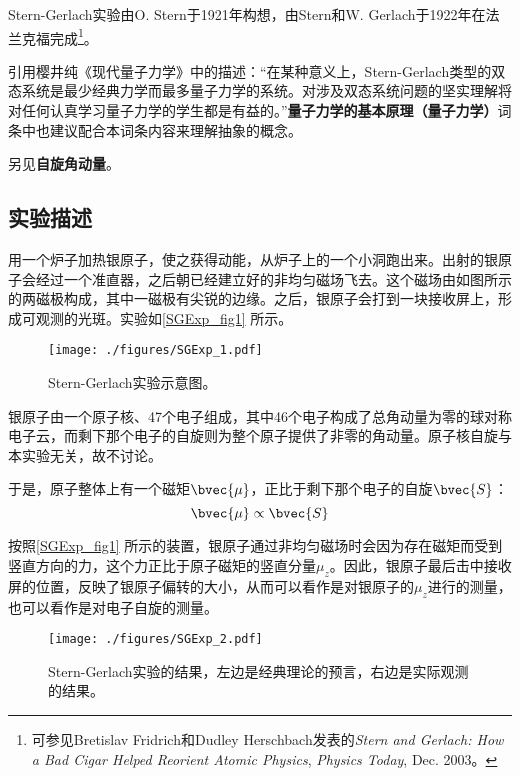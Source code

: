 


Stern-Gerlach实验由O. Stern于1921年构想，由Stern和W. Gerlach于1922年在法兰克福完成\footnote{可参见Bretislav Fridrich和Dudley Herschbach发表的\textsl{Stern and Gerlach: How a Bad Cigar Helped Reorient Atomic Physics}, \textsl{Physics Today}, Dec. 2003。}。

引用樱井纯《现代量子力学》中的描述：“在某种意义上，Stern-Gerlach类型的双态系统是最少经典力学而最多量子力学的系统。对涉及双态系统问题的坚实理解将对任何认真学习量子力学的学生都是有益的。”\textbf{量子力学的基本原理（量子力学）}词条中也建议配合本词条内容来理解抽象的概念。

另见\textbf{自旋角动量}。


\subsection{实验描述}

用一个炉子加热银原子，使之获得动能，从炉子上的一个小洞跑出来。出射的银原子会经过一个准直器，之后朝已经建立好的非均匀磁场飞去。这个磁场由如图所示的两磁极构成，其中一磁极有尖锐的边缘。之后，银原子会打到一块接收屏上，形成可观测的光斑。实验如\autoref{SGExp_fig1} 所示。


\begin{figure}[ht]
\centering
\texttt{[image: ./figures/SGExp\_1.pdf]}
\caption{Stern-Gerlach实验示意图。} \label{SGExp_fig1}
\end{figure}

银原子由一个原子核、47个电子组成，其中46个电子构成了总角动量为零的球对称电子云，而剩下那个电子的自旋则为整个原子提供了非零的角动量。原子核自旋与本实验无关，故不讨论。

于是，原子整体上有一个磁矩$\bvec{\mu}$，正比于剩下那个电子的自旋$\bvec{S}$：
\begin{equation}
\bvec{\mu}\propto\bvec{S}
\end{equation}

按照\autoref{SGExp_fig1} 所示的装置，银原子通过非均匀磁场时会因为存在磁矩而受到竖直方向的力，这个力正比于原子磁矩的竖直分量$\mu_z$。因此，银原子最后击中接收屏的位置，反映了银原子偏转的大小，从而可以看作是对银原子的$\mu_z$进行的测量，也可以看作是对电子自旋的测量。




\begin{figure}[ht]
\centering
\texttt{[image: ./figures/SGExp\_2.pdf]}
\caption{Stern-Gerlach实验的结果，左边是经典理论的预言，右边是实际观测的结果。} \label{SGExp_fig2}
\end{figure}


